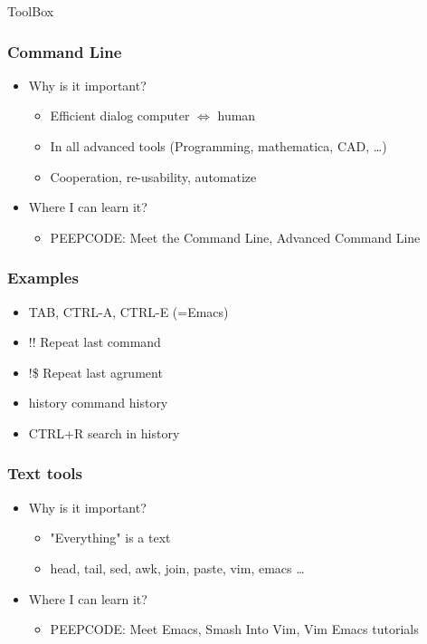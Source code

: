 \documentclass[fleqn]{beamer}
\begin{document}
\begin{section}{ToolBox}

  \begin{frame}\frametitle{Command Line}
  \begin{itemize}
    \item{Why is it important?}
    \begin{itemize}
      \item{Efficient dialog computer $\Longleftrightarrow$ human}
      \item{In all advanced tools (Programming, mathematica, CAD, \ldots)}
      \item{Cooperation, re-usability, automatize }
    \end{itemize}

    \item{Where I can learn it?}
    \begin{itemize}
      \item PEEPCODE: Meet the Command Line, Advanced Command Line  
    \end{itemize}
  \end{itemize}


  \end{frame}

  \begin{frame}\frametitle{Examples}
  \begin{itemize}
    \item TAB, CTRL-A, CTRL-E (=Emacs)
    \item !! Repeat last command
    \item !\$ Repeat last agrument
    \item history command history
    \item CTRL+R search in history
  \end{itemize}
  \end{frame}

  
  \begin{frame}\frametitle{Text tools}
  \begin{itemize}
    \item{Why is it important?}
      \begin{itemize}
      \item "Everything" is a text
      \item head, tail, sed, awk, join, paste, vim, emacs \ldots
      \end{itemize}
 \item{Where I can learn it?}
  \begin{itemize}
      \item PEEPCODE: Meet Emacs, Smash Into Vim, Vim Emacs tutorials
  \end{itemize}
  \end{itemize}
  \end{frame}


\end{section}
\end{document}
